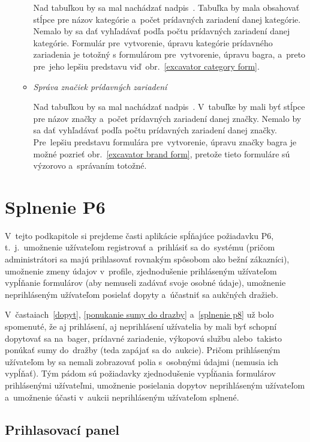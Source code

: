 \begin{itemize}
\begin{itemize}
Nad tabuľkou by sa mal nachádzať nadpis~. Tabuľka by mala obsahovať stĺpce pre názov kategórie a~počet prídavných zariadení danej kategórie. Nemalo by sa dať vyhľadávať podľa počtu prídavných zariadení danej kategórie. Formulár pre~vytvorenie, úpravu kategórie prídavného zariadenia je totožný s formulárom pre~vytvorenie, úpravu bagra, a~preto pre~jeho lepšiu predstavu viď~obr.~\ref{excavator category form}.

\item \textit{Správa značiek prídavných zariadení}

Nad tabuľkou by sa mal nachádzať nadpis~. V~tabuľke by mali byť stĺpce pre názov značky a~počet prídavných zariadení danej značky. Nemalo by sa dať vyhľadávať podľa počtu prídavných zariadení danej značky. Pre~lepšiu predstavu formulára pre~vytvorenie, úpravu značky bagra je možné pozrieť obr.~\ref{excavator brand form}, pretože tieto formuláre sú výzorovo a~správaním totožné.
\end{itemize}
\end{itemize}

\section{Splnenie P6}
\label{splnenie p6}

V~tejto podkapitole si prejdeme časti aplikácie spĺňajúce požiadavku P6, t.~j.~umožnenie užívateľom registrovať a~prihlásiť sa do~systému (pričom administrátori sa majú prihlasovať rovnakým spôsobom ako bežní zákazníci), umožnenie zmeny údajov v~profile, zjednodušenie prihláseným užívateľom vypĺňanie formulárov (aby nemuseli zadávať svoje osobné údaje), umožnenie neprihláseným užívateľom posielať dopyty a~účastniť sa aukčných dražieb.

V~častaiach~\ref{dopyt}, \ref{ponukanie sumy do drazby} a~\ref{splnenie p8} už bolo spomenuté, že aj prihlásení, aj neprihlásení užívatelia by mali byť schopní dopytovať sa na~bager, prídavné zariadenie, výkopovú službu alebo~takisto ponúkať sumy do~dražby (teda zapájať sa do~aukcie). Pričom prihláseným užívateľom by sa nemali zobrazovať polia s~osobnými údajmi (nemusia ich vypĺňať). Tým pádom sú požiadavky zjednodušenie vypĺňania formulárov prihlásenými užívateľmi, umožnenie posielania dopytov neprihláseným užívateľom a~umožnenie účasti v~aukcii neprihláseným užívateľom splnené.
\newpage
\subsection{Prihlasovací panel}

